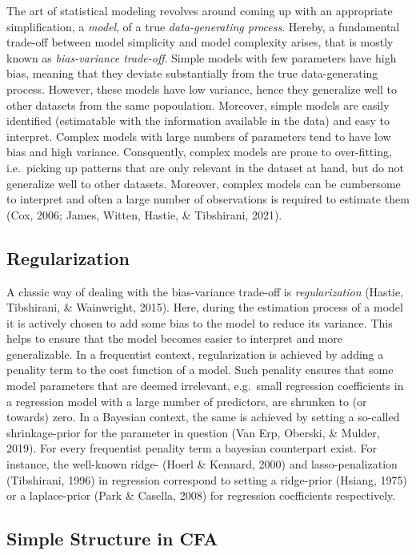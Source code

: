 \documentclass[
  english,
  man]{apa6}
\begin{document}
The art of statistical modeling revolves around coming up with an appropriate simplification, a \emph{model}, of a true \emph{data-generating process}. Hereby, a fundamental trade-off between model simplicity and model complexity arises, that is mostly known as \emph{bias-variance trade-off}. Simple models with few parameters have high bias, meaning that they deviate substantially from the true data-generating process. However, these models have low variance, hence they generalize well to other datasets from the same popoulation. Moreover, simple models are easily identified (estimatable with the information available in the data) and easy to interpret. Complex models with large numbers of parameters tend to have low bias and high variance. Consquently, complex models are prone to over-fitting, i.e.~picking up patterns that are only relevant in the dataset at hand, but do not generalize well to other datasets. Moreover, complex models can be cumbersome to interpret and often a large number of observations is required to estimate them (Cox, 2006; James, Witten, Hastie, \& Tibshirani, 2021).

\hypertarget{regularization}{%
\subsection{Regularization}\label{regularization}}

A classic way of dealing with the bias-variance trade-off is \emph{regularization} (Hastie, Tibshirani, \& Wainwright, 2015). Here, during the estimation process of a model it is actively chosen to add some bias to the model to reduce its variance. This helps to ensure that the model becomes easier to interpret and more generalizable. In a frequentist context, regularization is achieved by adding a penality term to the cost function of a model. Such penality ensures that some model parameters that are deemed irrelevant, e.g.~small regression coefficients in a regression model with a large number of predictors, are shrunken to (or towards) zero. In a Bayesian context, the same is achieved by setting a so-called shrinkage-prior for the parameter in question (Van Erp, Oberski, \& Mulder, 2019). For every frequentist penality term a bayesian counterpart exist. For instance, the well-known ridge- (Hoerl \& Kennard, 2000) and lasso-penalization (Tibshirani, 1996) in regression correspond to setting a ridge-prior (Hsiang, 1975) or a laplace-prior (Park \& Casella, 2008) for regression coefficients respectively.

\hypertarget{simple-structure-in-cfa}{%
\subsection{Simple Structure in CFA}\label{simple-structure-in-cfa}}
\end{document}
